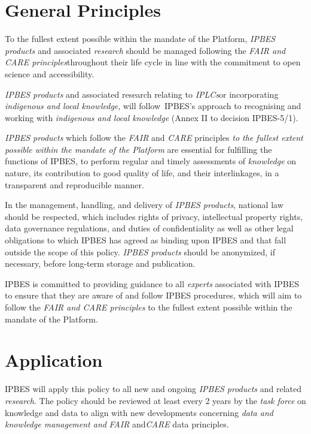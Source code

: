 \documentclass{article}
\begin{document}
\section*{General Principles}

To the fullest extent possible within the mandate of the Platform, \textit{IPBES products} and associated \textit{research} should be managed following the \textit{FAIR and CARE principles}throughout their life cycle in line with the commitment to open science and accessibility.

\textit{IPBES products} and associated research relating to \textit{IPLCs}or incorporating \textit{indigenous and local knowledge}, will follow IPBES’s approach to recognising and working with \textit{indigenous and local knowledge }(Annex II to decision IPBES-5/1).

\textit{IPBES products} which follow the \textit{FAIR }and\textit{ CARE }principles \textit{to the fullest extent possible within the mandate of the Platform} are essential for fulfilling the functions of IPBES, to perform regular and timely assessments of \textit{knowledge} on nature, its contribution to good quality of life, and their interlinkages, in a transparent and reproducible manner.

In the management, handling, and delivery of \textit{IPBES products}, national law should be respected, which includes rights of privacy, intellectual property rights, data governance regulations, and duties of confidentiality as well as other legal obligations to which IPBES has agreed as binding upon IPBES and that fall outside the scope of this policy. \textit{IPBES products }should be anonymized, if necessary, before long-term storage and publication.

IPBES is committed to providing guidance to all \textit{experts }associated with IPBES to ensure that they are aware of and follow IPBES procedures, which will aim to follow the \textit{FAIR and CARE principles} to the fullest extent possible within the mandate of the Platform.

\section*{Application}

IPBES will apply this policy to all new and ongoing \textit{IPBES products} and related \textit{research}. The policy should be reviewed at least every 2 years by the \textit{task force }on knowledge and data to align with new developments concerning \textit{data and knowledge management and} \textit{FAIR }and\textit{CARE }data principles. 
\end{document}
